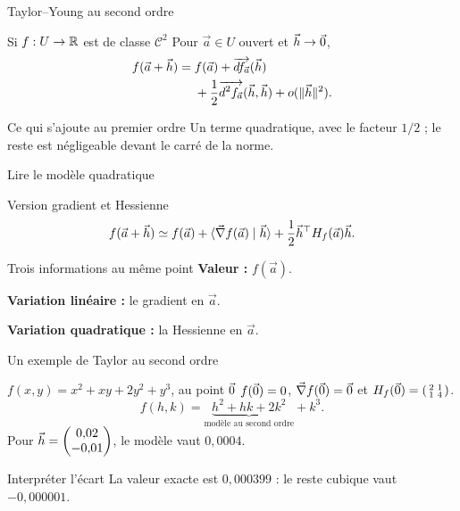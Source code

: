 \begin{frame}[t]{Taylor–Young au second ordre}
\coursanalyse
\begin{theoreme}{Si $f:U\to\mathbb R$ est de classe $\mathcal C^2$}
Pour $\vec a\in U$ ouvert et $\vec h\to\vec 0$,
\[\begin{aligned}
f(\vec a+\vec h)={}&f(\vec a)+\overrightarrow{df_{\vec a}}(\vec h)\\
&+\frac12\overrightarrow{d^2f_{\vec a}}(\vec h,\vec h)+o(\lVert \vec h\rVert^2).
\end{aligned}\]
\end{theoreme}
\begin{resultat}{Ce qui s’ajoute au premier ordre}
Un terme quadratique, avec le facteur $1/2$ ; le reste est négligeable devant le carré de la norme.
\end{resultat}
\end{frame}

\begin{frame}[t]{Lire le modèle quadratique}
\coursanalyse
\begin{resultat}{Version gradient et Hessienne}
\[f(\vec a+\vec h)\simeq f(\vec a)+\langle \vec\nabla f(\vec a)\mid \vec h\rangle
+\frac12\vec h^\top H_f(\vec a)\vec h.\]
\end{resultat}
\begin{cours}{Trois informations au même point}
\textbf{Valeur :} $f(\vec a)$.

\medskip
\textbf{Variation linéaire :} le gradient en $\vec a$.

\medskip
\textbf{Variation quadratique :} la Hessienne en $\vec a$.
\end{cours}
\end{frame}

\begin{frame}[t]{Un exemple de Taylor au second ordre}
\coursanalyse
\begin{exemple}{$f(x,y)=x^2+xy+2y^2+y^3$, au point $\vec 0$}
$f(\vec 0)=0$, $\vec\nabla f(\vec 0)=\vec 0$ et $H_f(\vec 0)=\left(\begin{smallmatrix}2&1\\1&4\end{smallmatrix}\right)$.
\[f(h,k)=\underbrace{h^2+hk+2k^2}_{\text{modèle au second ordre}}+k^3.\]
Pour $\vec h=\begin{pmatrix}0{,}02\\-0{,}01\end{pmatrix}$, le modèle vaut $0{,}0004$.
\end{exemple}
\begin{resultat}{Interpréter l’écart}
La valeur exacte est $0{,}000399$ : le reste cubique vaut $-0{,}000001$.
\end{resultat}
\end{frame}

